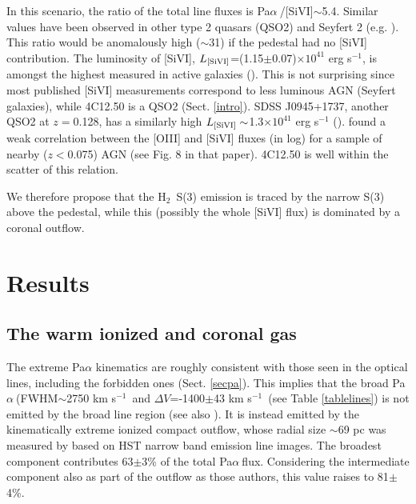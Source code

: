 \documentclass{aa}
\newcommand{\kms}{km s$^{-1}$~}
\newcommand{\pa}{Pa$\alpha~$}
\newcommand{\hmol}{H$_2$~}
\begin{document}
In this scenario,   the ratio of the total line fluxes is \pa/[SiVI]$\sim$5.4. Similar values have been observed in other type 2 quasars (QSO2) and Seyfert 2 (e.g.  \citealt{Riffel2006,Ramos2009,Ramos2019}).  This ratio would be anomalously high ($\sim$31) if the pedestal had no [SiVI] contribution.   The luminosity of [SiVI], $L_{\rm [SiVI]}$=(1.15$\pm$0.07)$\times 10^{41}$ erg s$^{-1}$,  is amongst the highest measured in active galaxies (\citealt{Ardila2011,Lamperti2017,Riffel2006,Cerqueira2021,DenBrok2022}). This is not surprising since most published [SiVI] measurements correspond to  less luminous AGN (Seyfert galaxies), while 4C12.50 is a QSO2 (Sect. \ref{intro}).   SDSS J0945+1737, another QSO2 at $z=$0.128, has a similarly high $L_{\rm [SiVI]}\sim$1.3$\times 10^{41}$ erg s$^{-1}$  (\citealt{Speranza2022}).   \cite{Lamperti2017} found a weak correlation between the [OIII] and [SiVI] fluxes (in log)  for a sample of nearby ($z<$0.075) AGN (see  Fig. 8 in that paper). 4C12.50  is well within the scatter of this relation.

We therefore propose that  the \hmol S(3) emission is traced by the narrow S(3)   above the pedestal, while this (possibly the whole [SiVI] flux) is dominated by a coronal outflow.






\section{Results}
\label{sec-results}





\subsection{The warm ionized and coronal gas}
\label{sec-ion}



The extreme Pa$\alpha$ kinematics are  roughly consistent with those seen in  the optical lines, including the forbidden ones (Sect. \ref{secpa}). This implies that the broad \pa (FWHM$\sim$2750 \kms and $\Delta V$=-1400$\pm$43 \kms (see Table \ref{tablelines}) is not emitted by the broad line region (see also \citealt{Rupke2005a}). It is instead emitted by the kinematically extreme ionized compact outflow, whose radial size $\sim$69 pc was measured by \cite{Tadhunter2018} based on HST narrow band emission line images. 
The  broadest component contributes 63$\pm$3\%  of  the total  \pa flux.
Considering the intermediate component  also as part of the outflow as those authors, this value raises to 81$\pm$4\%.
\end{document}
